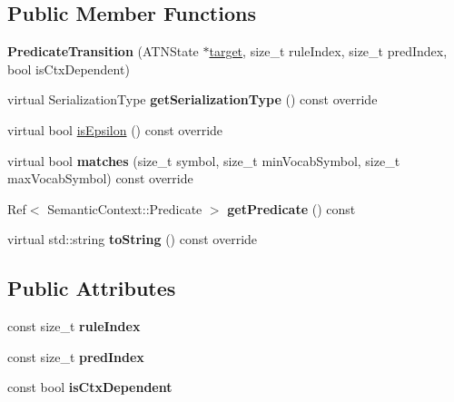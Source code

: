 \subsection*{Public Member Functions}
\begin{DoxyCompactItemize}
\item 
\mbox{\label{classantlr4_1_1atn_1_1PredicateTransition_a20b7f28813d8354e0ab4a0640bbc3dd8}} 
{\bfseries Predicate\+Transition} (A\+T\+N\+State $\ast$\hyperlink{classantlr4_1_1atn_1_1Transition_aaaed7f4ddda71e156b36de33e88f66a7}{target}, size\+\_\+t rule\+Index, size\+\_\+t pred\+Index, bool is\+Ctx\+Dependent)
\item 
\mbox{\label{classantlr4_1_1atn_1_1PredicateTransition_aa4e07458b069fca3942f0c40806511c4}} 
virtual Serialization\+Type {\bfseries get\+Serialization\+Type} () const override
\item 
virtual bool \hyperlink{classantlr4_1_1atn_1_1PredicateTransition_a1c43f41d9500f136375cff1d4b7a5d7a}{is\+Epsilon} () const override
\item 
\mbox{\label{classantlr4_1_1atn_1_1PredicateTransition_a591302c8f93899e1f34a3fed9bec151f}} 
virtual bool {\bfseries matches} (size\+\_\+t symbol, size\+\_\+t min\+Vocab\+Symbol, size\+\_\+t max\+Vocab\+Symbol) const override
\item 
\mbox{\label{classantlr4_1_1atn_1_1PredicateTransition_aa065f4b9ff9d9233297201a1745a472a}} 
Ref$<$ Semantic\+Context\+::\+Predicate $>$ {\bfseries get\+Predicate} () const
\item 
\mbox{\label{classantlr4_1_1atn_1_1PredicateTransition_a5a88452fc2500c1cc53d80b22e6213ff}} 
virtual std\+::string {\bfseries to\+String} () const override
\end{DoxyCompactItemize}
\subsection*{Public Attributes}
\begin{DoxyCompactItemize}
\item 
\mbox{\label{classantlr4_1_1atn_1_1PredicateTransition_a6c9a6bf78633daff12da16bb3006562a}} 
const size\+\_\+t {\bfseries rule\+Index}
\item 
\mbox{\label{classantlr4_1_1atn_1_1PredicateTransition_a37a57bbb22aa6f7b9044280a038614d6}} 
const size\+\_\+t {\bfseries pred\+Index}
\item 
\mbox{\label{classantlr4_1_1atn_1_1PredicateTransition_a2b0f4b8d87ce71109fb8b025461a08a0}} 
const bool {\bfseries is\+Ctx\+Dependent}
\end{DoxyCompactItemize}
